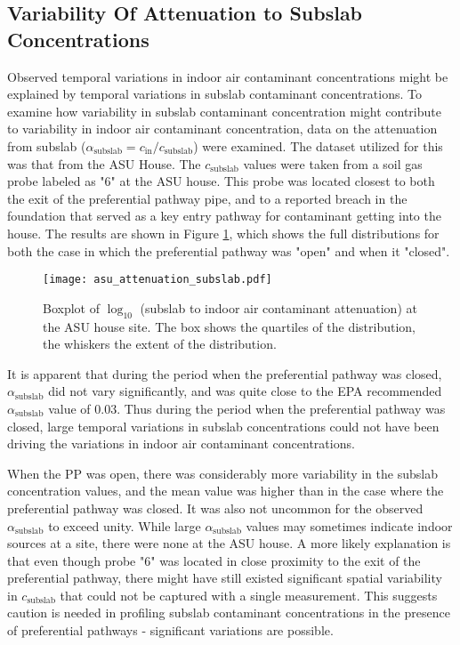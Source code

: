 \documentclass[preprint,12pt]{elsarticle}
\begin{document}
\subsection{Variability Of Attenuation to Subslab Concentrations}\label{s:results_attenuation}

Observed temporal variations in indoor air contaminant concentrations might be explained by temporal variations in subslab contaminant concentrations.
To examine how variability in subslab contaminant concentration might contribute to variability in indoor air contaminant concentration, data on the attenuation from subslab ($\alpha_\mathrm{subslab} = c_\mathrm{in}/c_\mathrm{subslab}$) were examined.
The dataset utilized for this was that from the ASU House.
The $c_\mathrm{subslab}$ values were taken from a soil gas probe labeled as "6" at the ASU house.
This probe was located closest to both the exit of the preferential pathway pipe, and to a reported breach in the foundation that served as a key entry pathway for contaminant getting into the house\cite{guo_identification_2015}.
The results are shown in Figure \ref{fig:attenuation_subslab}, which shows the full distributions for both the case in which the preferential pathway was "open" and when it "closed".\par

\begin{figure}[htb!]
  \centering
 \texttt{[image: asu\_attenuation\_subslab.pdf]}
 \caption{Boxplot of $\log_{10}$ (subslab to indoor air contaminant attenuation) at the ASU house site. The box shows the quartiles of the distribution, the whiskers the extent of the distribution.}\label{fig:attenuation_subslab}
\end{figure}

It is apparent that during the period when the preferential pathway was closed, $\alpha_\mathrm{subslab}$ did not vary significantly, and was quite close to the EPA recommended $\alpha_\mathrm{subslab}$ value of 0.03\cite{u.s._environmental_protection_agency_oswer_2015}.
Thus during the period when the preferential pathway was closed, large temporal variations in subslab concentrations could not have been driving the variations in indoor air contaminant concentrations.\par

When the PP was open, there was considerably more variability in the subslab concentration values, and the mean value was higher than in the case where the preferential pathway was closed.
It was also not uncommon for the observed $\alpha_\mathrm{subslab}$ to exceed unity.
While large $\alpha_\mathrm{subslab}$ values may sometimes indicate indoor sources at a site, there were none at the ASU house.
A more likely explanation is that even though probe "6" was located in close proximity to the exit of the preferential pathway, there might have still existed significant spatial variability in $c_\mathrm{subslab}$ that could not be captured with a single measurement.
This suggests caution is needed in profiling subslab contaminant concentrations in the presence of preferential pathways - significant variations are possible.\par
\end{document}
